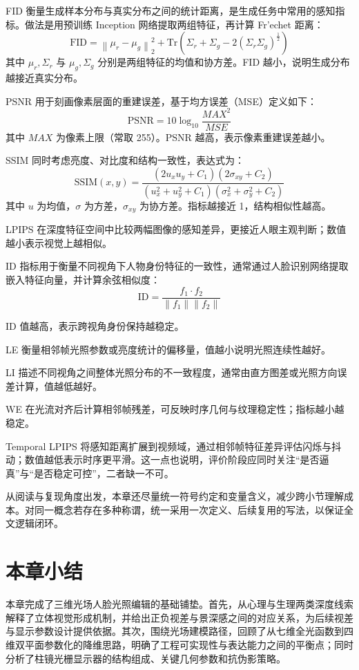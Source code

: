 FID 衡量生成样本分布与真实分布之间的统计距离，是生成任务中常用的感知指标。做法是用预训练 Inception 网络提取两组特征，再计算 Fr'echet 距离：
\begin{equation}
\text{FID} = \left\| \mu_r - \mu_g \right\|_2^2 + \text{Tr}\left( \Sigma_r + \Sigma_g - 2\left( \Sigma_r \Sigma_g \right)^{\frac{1}{2}} \right)
\end{equation}
其中 $\mu_r,\Sigma_r$ 与 $\mu_g,\Sigma_g$ 分别是两组特征的均值和协方差。FID 越小，说明生成分布越接近真实分布。

PSNR 用于刻画像素层面的重建误差，基于均方误差（MSE）定义如下：
\begin{equation}
\text{PSNR} = 10\log_{10} \frac{MAX^2}{MSE}
\end{equation}
其中 $MAX$ 为像素上限（常取 255）。PSNR 越高，表示像素重建误差越小。

SSIM 同时考虑亮度、对比度和结构一致性，表达式为：
\begin{equation}
\text{SSIM}(x, y) = \frac{(2u_x u_y + C_1)(2\sigma_{xy} + C_2)}{(u_x^2 + u_y^2 + C_1)(\sigma_x^2 + \sigma_y^2 + C_2)}
\end{equation}
其中 $u$ 为均值，$\sigma$ 为方差，$\sigma_{xy}$ 为协方差。指标越接近 1，结构相似性越高。

LPIPS 在深度特征空间中比较两幅图像的感知差异，更接近人眼主观判断；数值越小表示视觉上越相似。

ID 指标用于衡量不同视角下人物身份特征的一致性，通常通过人脸识别网络提取嵌入特征向量，并计算余弦相似度：
\begin{equation}
\text{ID} = \frac{f_1 \cdot f_2}{\left\| f_1 \right\| \left\| f_2 \right\|}
\end{equation}

ID 值越高，表示跨视角身份保持越稳定。

LE 衡量相邻帧光照参数或亮度统计的偏移量，值越小说明光照连续性越好。

LI 描述不同视角之间整体光照分布的不一致程度，通常由直方图差或光照方向误差计算，值越低越好。

WE 在光流对齐后计算相邻帧残差，可反映时序几何与纹理稳定性；指标越小越稳定。

Temporal LPIPS 将感知距离扩展到视频域，通过相邻帧特征差异评估闪烁与抖动；数值越低表示时序更平滑。这一点也说明，评价阶段应同时关注“是否逼真”与“是否稳定可控”，二者缺一不可。

从阅读与复现角度出发，本章还尽量统一符号约定和变量含义，减少跨小节理解成本。对同一概念若存在多种称谓，统一采用一次定义、后续复用的写法，以保证全文逻辑闭环。
\section{本章小结}
本章完成了三维光场人脸光照编辑的基础铺垫。首先，从心理与生理两类深度线索解释了立体视觉形成机制，并给出正负视差与景深感之间的对应关系，为后续视差与显示参数设计提供依据。其次，围绕光场建模路径，回顾了从七维全光函数到四维双平面参数化的降维思路，明确了工程可实现性与表达能力之间的平衡点；同时分析了柱镜光栅显示器的结构组成、关键几何参数和抗伪影策略。

